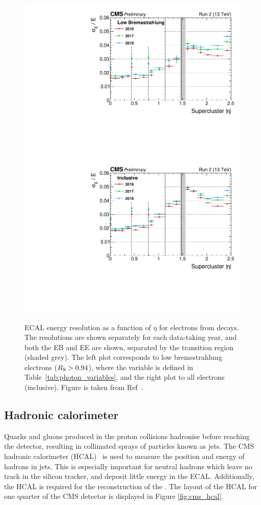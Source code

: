 \begin{figure}[htb!]
  \centering
  \includegraphics[width=.49\textwidth]{Figures/cms/final_Resolution_RunII_LowBremsstrahlung.pdf}
  \includegraphics[width=.49\textwidth]{Figures/cms/final_Resolution_RunII_Inclusive.pdf}
  \caption[Final ECAL energy resolution]
  {
    ECAL energy resolution as a function of $\eta$ for electrons from \Zee decays. The resolutions are shown separately for each data-taking year, and both the EB and EE are shown, separated by the transition region (shaded grey). The left plot corresponds to low bremsstrahlung electrons ($R_9>0.94$), where the variable \RNINE is defined in Table~\ref{tab:photon_variables}, and the right plot to all electrons (inclusive). Figure is taken from Ref~\cite{CMS-DP-2020-021}.
  }
  \label{fig:ecal_energy_resolution}
\end{figure}

\subsection{Hadronic calorimeter}\label{sec:cms_hcal}
Quarks and gluons produced in the proton collisions hadronise before reaching the detector, resulting in collimated sprays of particles known as jets. The CMS hadronic calorimeter (HCAL)~\cite{Chatrchyan:2008zzk,CMS:1997xji} is used to measure the position and energy of hadrons in jets. This is especially important for neutral hadrons which leave no track in the silicon tracker, and deposit little energy in the ECAL. Additionally, the HCAL is required for the reconstruction of the \met. The layout of the HCAL for one quarter of the CMS detector is displayed in Figure \ref{fig:cms_hcal}.

